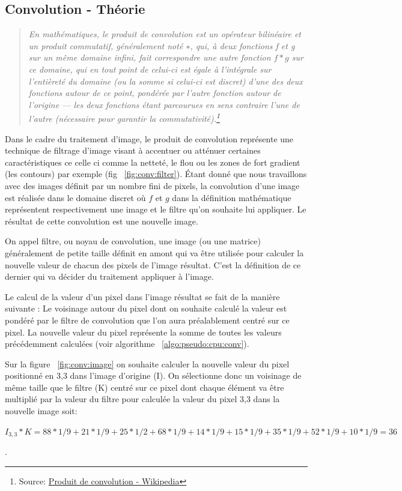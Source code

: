 \subsection{Convolution - Théorie}
\begin{quotation}
\textit{En mathématiques, le produit de convolution est un opérateur bilinéaire et un produit commutatif, généralement noté $∗$, qui, à deux fonctions f et g sur un même domaine infini, fait correspondre une autre fonction $f * g$ sur ce domaine, qui en tout point de celui-ci est égale à l'intégrale sur l'entièreté du domaine (ou la somme si celui-ci est discret) d'une des deux fonctions autour de ce point, pondérée par l'autre fonction autour de l'origine — les deux fonctions étant parcourues en sens contraire l'une de l'autre (nécessaire pour garantir la commutativité).\footnote{Source: \href{https://fr.wikipedia.org/wiki/Produit_de_convolution}{Produit de convolution - Wikipedia}}}
\end{quotation}

Dans le cadre du traitement d'image, le produit de convolution représente une technique de filtrage d'image visant à accentuer ou atténuer certaines caractéristiques ce celle ci comme la netteté, le flou ou les zones de fort gradient (les contours) par exemple (fig ~\ref{fig:conv:filter}). Étant donné que nous travaillons avec des images définit par un nombre fini de pixels, la convolution d'une image est réalisée dans le domaine discret où $f$ et $g$ dans la définition mathématique représentent respectivement une image et le filtre qu'on souhaite lui appliquer. Le résultat de cette convolution est une nouvelle image.

On appel filtre, ou noyau de convolution, une image (ou une matrice) généralement de petite taille définit en amont qui va être utilisée pour calculer la nouvelle valeur de chacun des pixels de l'image résultat. C'est la définition de ce dernier qui va décider du traitement appliquer à l'image. 

Le calcul de la valeur d'un pixel dans l'image résultat se fait de la manière suivante : Le voisinage autour du pixel dont on souhaite calculé la valeur est pondéré par le filtre de convolution que l'on aura préalablement centré sur ce pixel. La nouvelle valeur du pixel représente la somme de toutes les valeurs précédemment calculées (voir algorithme ~\ref{algo:pseudo:cpu:conv}).

Sur la figure ~\ref{fig:conv:image} on souhaite calculer la nouvelle valeur du pixel positionné en 3,3 dans l'image d'origine (I). On sélectionne donc un voisinage de même taille que le filtre (K) centré sur ce pixel dont chaque élément va être multiplié par la valeur du filtre pour calculée la valeur du pixel 3,3 dans la nouvelle image soit: 
\begin{center}
$I_{3,3} * K = 88 * 1/9 + 21 * 1/9 + 25 * 1/2 + 68 * 1/9 + 14 * 1/9 + 15 * 1/9 + 35 * 1/9 + 52 * 1/9 + 10 * 1/9 = 36$
\end{center}.


